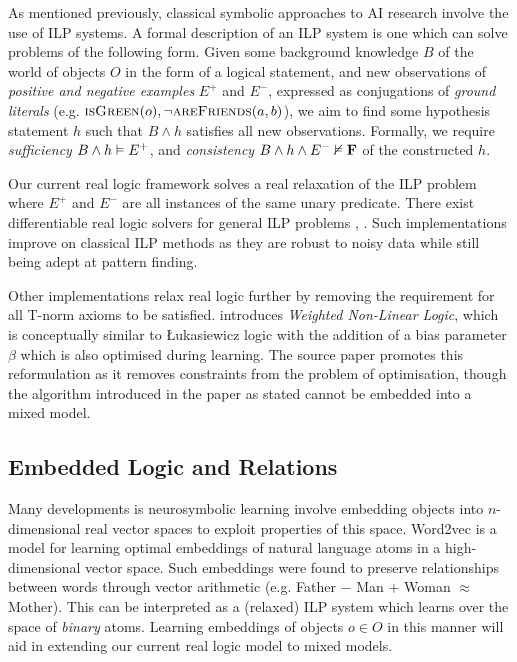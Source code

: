 As mentioned previously, classical symbolic approaches to AI research involve the use of ILP systems. A formal description of an ILP system is one which can solve problems of the following form. Given some background knowledge $B$ of the world of objects $O$ in the form of a logical statement, and new observations of \textit{positive and negative examples} $E^+$ and $E^-$, expressed as conjugations of \textit{ground literals} (e.g. $\textsc{isGreen}(o), \lnot \textsc{areFriends}(a,b)$), we aim to find some hypothesis statement $h$ such that $B \land h$ satisfies all new observations. Formally, we require \textit{sufficiency} $B \land h \vDash E^+$, and \textit{consistency} $B \land h \land E^- \nvDash \textbf{F}$ of the constructed $h$.

Our current real logic framework solves a real relaxation of the ILP problem where $E^+$ and $E^-$ are all instances of the same unary predicate. There exist differentiable real logic solvers for general ILP problems \cite{diffilp}, \cite{diffilpGT}. Such implementations improve on classical ILP methods as they are robust to noisy data while still being adept at pattern finding.

Other implementations relax real logic further by removing the requirement for all T-norm axioms to be satisfied. \cite{lnnibm} introduces \textit{Weighted Non-Linear Logic}, which is conceptually similar to Łukasiewicz logic with the addition of a bias parameter $\beta$ which is also optimised during learning. The source paper promotes this reformulation as it removes constraints from the problem of optimisation, though the algorithm introduced in the paper as stated cannot be embedded into a mixed model.

\subsection{Embedded Logic and Relations}

Many developments is neurosymbolic learning involve embedding objects into $n$-dimensional real vector spaces to exploit properties of this space. Word2vec \cite{word2vec} is a model for learning optimal embeddings of natural language atoms in a high-dimensional vector space. Such embeddings were found to preserve relationships between words through vector arithmetic \cite{word2vecrelations} (e.g. Father $-$ Man $+$ Woman $\approx$ Mother). This can be interpreted as a (relaxed) ILP system which learns over the space of \textit{binary} atoms. Learning embeddings of objects $o \in O$ in this manner will aid in extending our current real logic model to mixed models.


